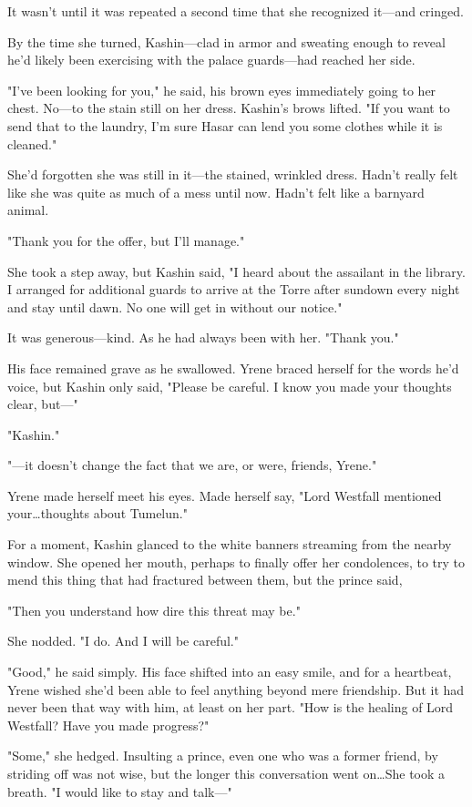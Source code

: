 It wasn't until it was repeated a second time that she recognized it---and cringed.

By the time she turned, Kashin---clad in armor and sweating enough to reveal he'd likely been exercising with the palace guards---had reached her side.

"I've been looking for you," he said, his brown eyes immediately going to her chest.
No---to the stain still on her dress.
Kashin's brows lifted.
"If you want to send that to the laundry, I'm sure Hasar can lend you some clothes while it is cleaned."

She'd forgotten she was still in it---the stained, wrinkled dress.
Hadn't really felt like she was quite as much of a mess until now.
Hadn't felt like a barnyard animal.

"Thank you for the offer, but I'll manage."

She took a step away, but Kashin said, "I heard about the assailant in the library.
I arranged for additional guards to arrive at the Torre after sundown every night and stay until dawn.
No one will get in without our notice."

It was generous---kind.
As he had always been with her.
"Thank you."

His face remained grave as he swallowed.
Yrene braced herself for the words he'd voice, but Kashin only said, "Please be careful.
I know you made your thoughts clear, but---"

"Kashin."

"---it doesn't change the fact that we are, or were, friends, Yrene."

Yrene made herself meet his eyes.
Made herself say, "Lord Westfall mentioned your\ldots thoughts about Tumelun."

For a moment, Kashin glanced to the white banners streaming from the nearby window.
She opened her mouth, perhaps to finally offer her condolences, to try to mend this thing that had fractured between them, but the prince said,

"Then you understand how dire this threat may be."

She nodded.
"I do.
And I will be careful."

"Good," he said simply.
His face shifted into an easy smile, and for a heartbeat, Yrene wished she'd been able to feel anything beyond mere friendship.
But it had never been that way with him, at least on her part.
"How is the healing of Lord Westfall?
Have you made progress?"

"Some," she hedged.
Insulting a prince, even one who was a former friend, by striding off was not wise, but the longer this conversation went on\ldots She took a breath.
"I would like to stay and talk---"

